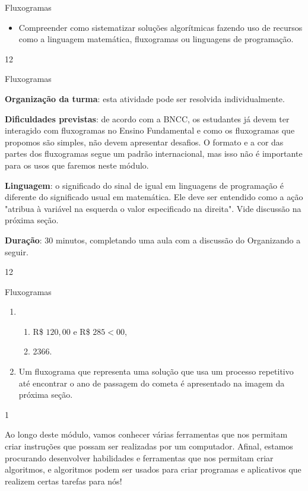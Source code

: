 \label{comp-exp2}
\clearmargin
\begin{objectives}{Fluxogramas}
{
\begin{itemize}
\item Compreender como sistematizar soluções algorítmicas fazendo uso de recursos como a linguagem matemática, fluxogramas ou linguagens de programação.
\end{itemize}
}{1}{2}
\end{objectives}
\begin{sugestions}{Fluxogramas}
{
\textbf{Organização da turma}: esta atividade pode ser resolvida individualmente.

\textbf{Dificuldades previstas}: de acordo com a BNCC, os estudantes já devem ter interagido com fluxogramas no Ensino Fundamental e como os fluxogramas que propomos são simples, não devem apresentar desafios. O formato e a cor das partes dos fluxogramas segue um padrão internacional, mas isso não é importante para os usos que faremos neste módulo.

\textbf{Linguagem}: o significado do sinal de igual em linguagens de programação é diferente do significado usual em matemática. Ele deve ser entendido como a ação "atribua à variável na esquerda o valor especificado na direita". Vide discussão na próxima seção.

\textbf{Duração}: 30 minutos, completando uma aula com a discussão do Organizando a seguir.
}{1}{2}
\end{sugestions}
\begin{answer}{Fluxogramas}
{
\begin{enumerate}
\item 
\begin{enumerate}
\item R\$ $120{,}00$ e R\$ $285<00$, 
\item 2366.
\end{enumerate}

\item Um fluxograma que representa uma solução que usa um processo repetitivo até encontrar o ano de passagem do cometa é apresentado na imagem da próxima seção.
\end{enumerate}
}{1}
\end{answer}

Ao longo deste módulo, vamos conhecer várias ferramentas que nos permitam criar instruções que possam ser realizadas por um computador. Afinal, estamos procurando desenvolver habilidades e ferramentas que nos permitam criar algoritmos, e algoritmos podem ser usados para criar programas e aplicativos que realizem certas tarefas para nós!

